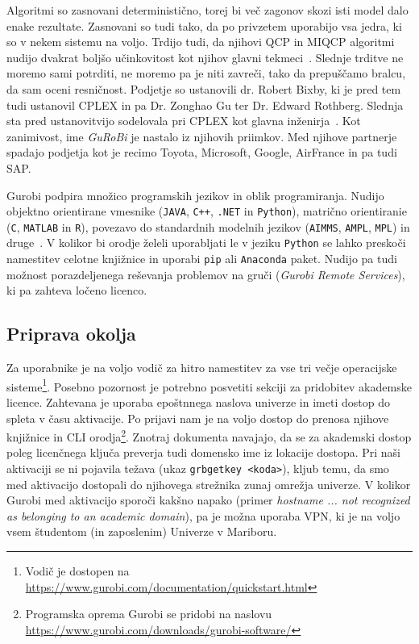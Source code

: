 \documentclass[a4paper,11pt]{article}
\begin{document}
Algoritmi so zasnovani deterministično, torej bi več zagonov skozi isti model dalo enake rezultate. Zasnovani so tudi tako, da po privzetem uporabijo vsa jedra, ki so v nekem sistemu na voljo. Trdijo tudi, da njihovi QCP in MIQCP algoritmi nudijo dvakrat boljšo učinkovitost kot njihov glavni tekmeci~\cite{GurobiBrochure:2020}. Slednje trditve ne moremo  sami potrditi, ne moremo pa je niti zavreči, tako da prepuščamo bralcu, da sam oceni resničnost. Podjetje so ustanovili dr. Robert Bixby, ki je pred tem tudi ustanovil CPLEX in pa Dr. Zonghao 	Gu ter Dr. Edward Rothberg. Slednja sta pred ustanovitvijo sodelovala pri CPLEX kot glavna inženirja~\cite{GurobiTeam:2020}. Kot zanimivost, ime \textit{GuRoBi} je nastalo iz njihovih priimkov. Med njihove partnerje spadajo podjetja kot je recimo Toyota, Microsoft, Google, AirFrance in pa tudi SAP.

Gurobi podpira množico programskih jezikov in oblik programiranja. Nudijo objektno orientirane vmesnike (\texttt{JAVA}, \texttt{C++}, \texttt{.NET} in \texttt{Python}), matrično orientiranie (\texttt{C}, \texttt{MATLAB} in \texttt{R}), povezavo do standardnih modelnih jezikov (\texttt{AIMMS}, \texttt{AMPL}, \texttt{MPL}) in druge~\cite{GurobiOptimizer:2020}. V kolikor bi orodje želeli uporabljati le v jeziku \texttt{Python} se lahko preskoči namestitev celotne knjižnice in uporabi \texttt{pip} ali \texttt{Anaconda} paket. Nudijo pa tudi možnost porazdeljenega reševanja problemov na gruči (\textit{Gurobi Remote Services}), ki pa zahteva ločeno licenco.

\subsection{Priprava okolja}
\label{gurobi_install}

Za uporabnike je na voljo vodič za hitro namestitev za vse tri večje operacijske sisteme\footnote{Vodič je dostopen na \url{https://www.gurobi.com/documentation/quickstart.html}}. Posebno pozornost je potrebno posvetiti sekciji za pridobitev akademske licence. Zahtevana je uporaba epoštnnega naslova univerze in imeti dostop do spleta v času aktivacije. Po prijavi nam je na voljo dostop do prenosa njihove knjižnice in CLI orodja\footnote{Programska oprema Gurobi se pridobi na naslovu \url{https://www.gurobi.com/downloads/gurobi-software/}}. Znotraj dokumenta navajajo, da se za akademski dostop poleg licenčnega ključa preverja tudi domensko ime iz lokacije dostopa. Pri naši aktivaciji se ni pojavila težava (ukaz \texttt{grbgetkey \textless koda\textgreater}), kljub temu, da smo med aktivacijo dostopali do njihovega strežnika zunaj omrežja univerze. V kolikor Gurobi med aktivacijo sporoči kakšno napako (primer \textit{hostname ... not recognized as belonging to an academic domain}), pa je možna uporaba VPN, ki je na voljo vsem študentom (in zaposlenim) Univerze v Mariboru.
\end{document}
